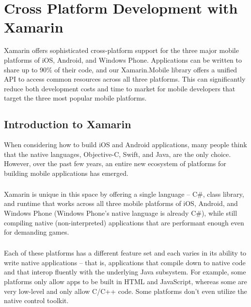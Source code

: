 \chapter{Cross Platform Development with Xamarin} %

\label{Chapter4} %


 Xamarin offers sophisticated cross-platform support for the three major mobile platforms of iOS, Android, and Windows Phone.
 Applications can be written to share up to 90\% of their code, and our Xamarin.Mobile library offers a unified API to access common resources across all three platforms.
 This can significantly reduce both development costs and time to market for mobile developers that target the three most popular mobile platforms.



 \section{Introduction to Xamarin}

 When considering how to build iOS and Android applications, many people think that the native languages, Objective-C, Swift, and Java, are the only choice. However, over the past few years, an entire new ecosystem of platforms for building mobile applications has emerged.


 \paragraph{}
 Xamarin is unique in this space by offering a single language – C\#, class library, and runtime that works across all three mobile platforms of iOS, Android, and Windows Phone (Windows Phone’s native language is already C\#), while still compiling native (non-interpreted) applications that are performant enough even for demanding games.


 \paragraph{}
 Each of these platforms has a different feature set and each varies in its ability to write native applications – that is, applications that compile down to native code and that interop fluently with the underlying Java subsystem. For example, some platforms only allow apps to be built in HTML and JavaScript, whereas some are very low-level and only allow C/C++ code. Some platforms don’t even utilize the native control toolkit.

